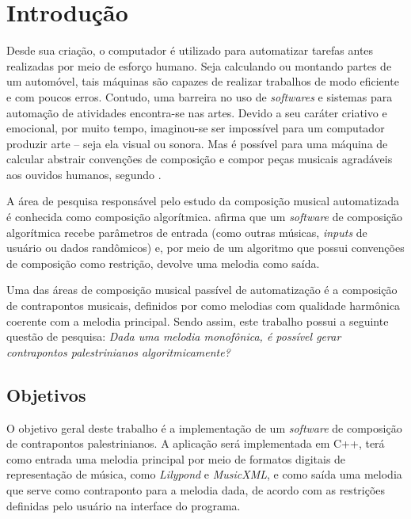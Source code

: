 \chapter*[Introdução]{Introdução}

  Desde sua criação, o computador é utilizado para automatizar tarefas antes realizadas por meio de esforço humano. Seja calculando ou montando partes de um automóvel, tais máquinas são capazes de realizar trabalhos de modo eficiente e com poucos erros. Contudo, uma barreira no uso de \textit{softwares} e sistemas para automação de atividades encontra-se nas artes. Devido a seu caráter criativo e emocional, por muito tempo, imaginou-se ser impossível para um computador produzir arte -- seja ela visual ou sonora. Mas é possível para uma máquina de calcular abstrair convenções de composição e compor peças musicais agradáveis aos ouvidos humanos, segundo .

  A área de pesquisa responsável pelo estudo da composição musical automatizada é conhecida como composição algorítmica.  afirma que um \textit{software} de composição algorítmica recebe parâmetros de entrada (como outras músicas, \textit{inputs} de usuário ou dados randômicos) e, por meio de um algoritmo que possui convenções de composição como restrição, devolve uma melodia como saída.

  Uma das áreas de composição musical passível de automatização é a composição de contrapontos musicais, definidos por  como melodias com qualidade harmônica coerente com a melodia principal. Sendo assim, este trabalho possui a seguinte questão de pesquisa: \textit{Dada uma melodia monofônica, é possível gerar contrapontos palestrinianos algoritmicamente?}

  \section*{Objetivos}

    O objetivo geral deste trabalho é a implementação de um \textit{software} de composição de contrapontos palestrinianos. A aplicação será implementada em C++, terá como entrada uma melodia principal por meio de formatos digitais de representação de música, como \textit{Lilypond}\footnotemark {} e \textit{MusicXML}\footnotemark {}, e como saída uma melodia que serve como contraponto para a melodia dada, de acordo com as restrições definidas pelo usuário na interface do programa.

